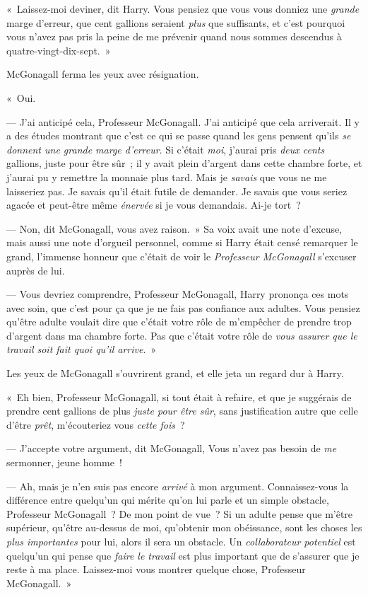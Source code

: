«~Laissez-moi deviner, dit Harry. Vous pensiez que vous vous donniez une \emph{grande} marge d'erreur, que cent gallions seraient \emph{plus} que suffisants, et c'est pourquoi vous n'avez pas pris la peine de me prévenir quand nous sommes descendus à quatre-vingt-dix-sept.~»

McGonagall ferma les yeux avec résignation.

«~Oui.

--- J'ai anticipé cela, Professeur McGonagall. J'ai anticipé que cela arriverait. Il y a des études montrant que c'est ce qui se passe quand les gens pensent qu'ils \emph{se donnent une grande marge d'erreur}. Si c'était \emph{moi}, j'aurai pris \emph{deux cents} gallions, juste pour être sûr~; il y avait plein d'argent dans cette chambre forte, et j'aurai pu y remettre la monnaie plus tard. Mais je \emph{savais} que vous ne me laisseriez pas. Je savais qu'il était futile de demander. Je savais que vous seriez agacée et peut-être même \emph{énervée} si je vous demandais. Ai-je tort~?

--- Non, dit McGonagall, vous avez raison.~» Sa voix avait une note d'excuse, mais aussi une note d'orgueil personnel, comme si Harry était censé remarquer le grand, l'immense honneur que c'était de voir le \emph{Professeur McGonagall} s'excuser auprès de lui.

--- Vous devriez comprendre, Professeur McGonagall, Harry prononça ces mots avec soin, que c'est pour ça que je ne fais pas confiance aux adultes. Vous pensiez qu'être adulte voulait dire que c'était votre rôle de m'empêcher de prendre trop d'argent dans ma chambre forte. Pas que c'était votre rôle de \emph{vous assurer que le travail soit fait quoi qu'il arrive}.~»

Les yeux de McGonagall s'ouvrirent grand, et elle jeta un regard dur à Harry.

«~Eh bien, Professeur McGonagall, si tout était à refaire, et que je suggérais de prendre cent gallions de plus \emph{juste pour être sûr}, sans justification autre que celle d'être \emph{prêt}, m'écouteriez vous \emph{cette fois}~?

--- J'accepte votre argument, dit McGonagall, Vous n'avez pas besoin de \emph{me} sermonner, jeune homme~!

--- Ah, mais je n'en suis pas encore \emph{arrivé} à mon argument. Connaissez-vous la différence entre quelqu'un qui mérite qu'on lui parle et un simple obstacle, Professeur McGonagall~? De mon point de vue~? Si un adulte pense que m'être supérieur, qu'être au-dessus de moi, qu'obtenir mon obéissance, sont les choses les \emph{plus importantes} pour lui, alors il sera un obstacle. Un \emph{collaborateur potentiel} est quelqu'un qui pense que \emph{faire le travail} est plus important que de s'assurer que je reste à ma place. Laissez-moi vous montrer quelque chose, Professeur McGonagall.~»

